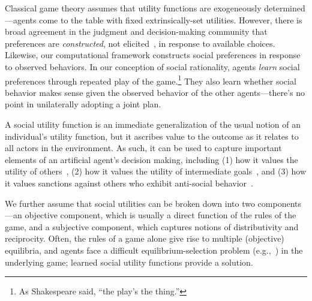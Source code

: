 Classical game theory assumes that utility functions are exogeneously
determined---agents come to the table with fixed
extrinsically-set utilities.
However, there is broad agreement in the judgment and decision-making
community that preferences are \emph{constructed}, not
elicited~\cite{Payne_Bettman_Johnson_1993}, in response to available
choices.  Likewise, our computational framework 
constructs social preferences
in response to observed behaviors.  In our conception of social
rationality, agents \emph{learn\/} social preferences through repeated
play of the game.\footnote{As Shakespeare said, ``the play's the
  thing.''} They also learn whether social behavior makes sense given
the observed behavior of the other agents---there's no point in
unilaterally adopting a joint plan.

A social utility function is an immediate generalization of the usual
notion of an individual's utility function, but it ascribes value to
the outcome as it relates to all actors in the environment.
%
%
As such, it can be used to capture important elements of an artificial
agent's decision making, including (1) how it values the utility of
others~\cite{littman01d}, (2) how it values the utility of
intermediate goals~\cite{macglashan15b}, and (3) how it values
sanctions against others who exhibit anti-social
behavior~\cite{macglashan14c}.

We further assume that social utilities can be broken down into two
components---an objective component, which is usually a direct
function of the rules of the game, and a subjective component, which
captures notions of distributivity and reciprocity.
%
Often, the rules of a game alone give rise to multiple (objective)
equilibria, and agents face a difficult equilibrium-selection
problem (e.g.,~\cite{schelling1980strategy}) in the underlying game;
learned social utility functions provide a solution.

